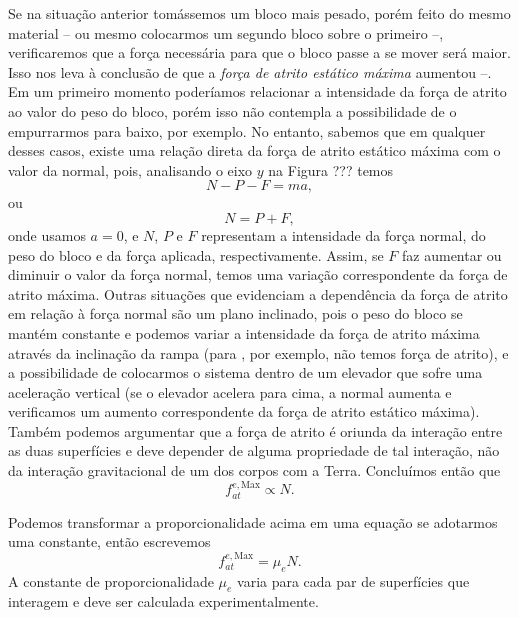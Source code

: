 Se na situação anterior tomássemos um bloco mais pesado, porém feito do mesmo material -- ou mesmo colocarmos um segundo bloco sobre o primeiro --, verificaremos que a força necessária para que o bloco passe a se mover será maior. Isso nos leva à conclusão de que a \emph{força de atrito estático máxima} aumentou --. Em um primeiro momento poderíamos relacionar a intensidade da força de atrito ao valor do peso do bloco, porém isso não contempla a possibilidade de o empurrarmos para baixo, por exemplo. No entanto, sabemos que em qualquer desses casos, existe uma relação direta da força de atrito estático máxima com o valor da normal, pois, analisando o eixo $y$ na Figura ??? temos
\begin{equation}
  N - P - F = ma,
\end{equation}
%
ou
\begin{equation}
  N = P + F,
\end{equation}
onde usamos $a = 0$, e $N$, $P$ e $F$ representam a intensidade da força normal,  do peso do bloco e da força aplicada, respectivamente. Assim, se $F$ faz aumentar ou diminuir o valor da força normal, temos uma variação correspondente da força de atrito máxima. Outras situações que evidenciam a dependência da força de atrito em relação à força normal são um plano inclinado, pois o peso do bloco se mantém constante e podemos variar a intensidade da força de atrito máxima através da inclinação da rampa (para , por exemplo, não temos força de atrito), e a possibilidade de colocarmos o sistema dentro de um elevador que sofre uma aceleração vertical (se o elevador acelera para cima, a normal aumenta e verificamos um aumento correspondente da força de atrito estático máxima). Também podemos argumentar que a força de atrito é oriunda da interação entre as duas superfícies e deve depender de alguma propriedade de tal interação, não da interação gravitacional de um dos corpos com a Terra. Concluímos então que
\begin{equation}
  f_{at}^{e, \textrm{Max}} \propto N.
\end{equation}

Podemos transformar a proporcionalidade acima em uma equação se adotarmos uma constante, então escrevemos
\begin{equation}
  f_{at}^{e, \textrm{Max}} = \mu_e N.
\end{equation}
%
A constante de proporcionalidade $\mu_e$ varia para cada par de superfícies que interagem e deve ser calculada experimentalmente.

